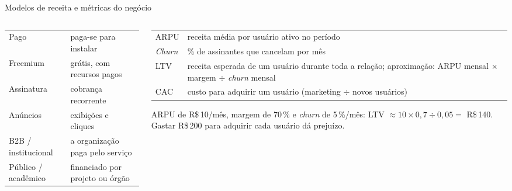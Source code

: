 \begin{frame}{Modelos de receita e métricas do negócio}
  \begin{columns}[T]
    \begin{column}{0.46\textwidth}
      \scriptsize
      \begin{tabularx}{\linewidth}{@{}l L@{}}
        \toprule
         &  \\
        \midrule
        Pago & paga-se para instalar \\
        Freemium & grátis, com recursos pagos \\
        Assinatura & cobrança recorrente \\
        Anúncios & exibições e cliques \\
        B2B / institucional & a organização paga pelo serviço \\
        Público / acadêmico & financiado por projeto ou órgão \\
        \bottomrule
      \end{tabularx}
    \end{column}
    \begin{column}{0.52\textwidth}
      \scriptsize
      \begin{tabularx}{\linewidth}{@{}l L@{}}
        \toprule
         &  \\
        \midrule
        ARPU & receita média por usuário ativo no período \\
        \emph{Churn} & \% de assinantes que cancelam por mês \\
        LTV & receita esperada de um usuário durante toda a relação; aproximação: ARPU mensal $\times$ margem $\div$ \emph{churn} mensal \\
        CAC & custo para adquirir um usuário (marketing $\div$ novos usuários) \\
        \bottomrule
      \end{tabularx}
      \begin{exemplo}
        ARPU de R\$\,10/mês, margem de 70\,\% e \emph{churn} de 5\,\%/mês: LTV $\approx 10 \times 0{,}7 \div 0{,}05 =$ R\$\,140. Gastar R\$\,200 para adquirir cada usuário dá prejuízo.
      \end{exemplo}
    \end{column}
  \end{columns}
\end{frame}
